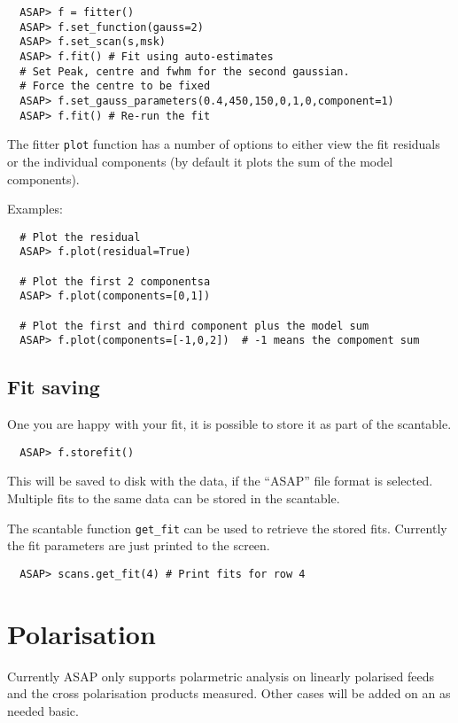 \documentclass[11pt]{article}
\newcommand{\cmd}[1]{{\tt #1}}
\begin{document}
\begin{verbatim}
  ASAP> f = fitter()
  ASAP> f.set_function(gauss=2)
  ASAP> f.set_scan(s,msk)
  ASAP> f.fit() # Fit using auto-estimates
  # Set Peak, centre and fwhm for the second gaussian.
  # Force the centre to be fixed
  ASAP> f.set_gauss_parameters(0.4,450,150,0,1,0,component=1)
  ASAP> f.fit() # Re-run the fit
\end{verbatim}

The fitter \cmd{plot} function has a number of options to either view
the fit residuals or the individual components (by default it plots
the sum of the model components).

Examples:

\begin{verbatim}
  # Plot the residual
  ASAP> f.plot(residual=True)

  # Plot the first 2 componentsa
  ASAP> f.plot(components=[0,1])

  # Plot the first and third component plus the model sum
  ASAP> f.plot(components=[-1,0,2])  # -1 means the compoment sum
\end{verbatim}

\subsection{Fit saving}

One you are happy with your fit, it is possible to store it as part of
the scantable.

\begin{verbatim}
  ASAP> f.storefit()
\end{verbatim}

This will be saved to disk with the data, if the ``ASAP'' file format
is selected. Multiple fits to the same data can be stored in the
scantable.

The scantable function \cmd{get\_fit} can be used to retrieve the
stored fits. Currently the fit parameters are just printed to the
screen.

\begin{verbatim}
  ASAP> scans.get_fit(4) # Print fits for row 4
\end{verbatim}

\section{Polarisation}

Currently ASAP only supports polarmetric analysis on linearly
polarised feeds and the cross polarisation products measured. Other
cases will be added on an as needed basic.
\end{document}
